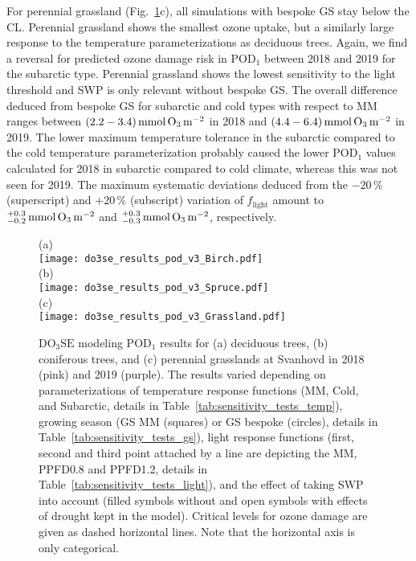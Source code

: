 \documentclass[bg, manuscript]{copernicus}
\begin{document}
For perennial grassland (Fig.~\ref{fig:pody_rel}c), all simulations with bespoke GS stay below the CL. Perennial grassland shows the smallest ozone uptake, but a similarly large response to the temperature parameterizations as deciduous trees. Again, we find a reversal for predicted ozone damage risk in $\mathrm{POD_1}$ between 2018 and 2019 for the subarctic type. Perennial grassland shows the lowest sensitivity to the light threshold and SWP is only relevant without bespoke GS. The overall difference deduced from bespoke GS for subarctic and cold types with respect to MM ranges between $(2.2-3.4)\,\unit{mmol\,\chem{O_3}\,m^{-2}}$ in 2018 and $(4.4-6.4)\,\unit{mmol\,\chem{O_3}\,m^{-2}}$ in 2019. The lower maximum temperature tolerance in the subarctic compared to the cold temperature parameterization probably caused the lower $\mathrm{POD_1}$ values calculated for 2018 in subarctic compared to cold climate, whereas this was not seen for 2019. The maximum systematic deviations deduced from the $-20\,\unit{\%}$ (superscript) and $+20\,\unit{\%}$ (subscript) variation of $f_\mathrm{light}$ amount to $^{+0.3}_{-0.2}\,\unit{mmol\,\chem{O_3}\,m^{-2}}$ and $^{+0.3}_{-0.3}\,\unit{mmol\,\chem{O_3}\,m^{-2}}$, respectively.

\begin{figure}[t]
  \centering
  (a)\\
  \texttt{[image: do3se\_results\_pod\_v3\_Birch.pdf]}\\
  (b)\\
  \texttt{[image: do3se\_results\_pod\_v3\_Spruce.pdf]}\\
  (c)\\
  \texttt{[image: do3se\_results\_pod\_v3\_Grassland.pdf]}
  \caption{$\mathrm{DO_3SE}$ modeling $\mathrm{POD_1}$ results for (a) deciduous trees, (b) coniferous trees, and (c) perennial grasslands at Svanhovd in 2018 (pink) and 2019 (purple). The results varied depending on parameterizations of temperature response functions (MM, Cold, and Subarctic, details in Table~\ref{tab:sensitivity_tests_temp}), growing season (GS MM (squares) or GS bespoke (circles), details in Table~\ref{tab:sensitivity_tests_gs}), light response functions (first, second and third point attached by a line are depicting the MM, PPFD0.8 and PPFD1.2, details in Table~\ref{tab:sensitivity_tests_light}), and the effect of taking SWP into account (filled symbols without and open symbols with effects of drought kept in the model). Critical levels for ozone damage \citep{ICP:MappingManual2017,ESPR:Hayes2021} are given as dashed horizontal lines. Note that the horizontal axis is only categorical.}
  \label{fig:pody_rel}
\end{figure}
\end{document}
